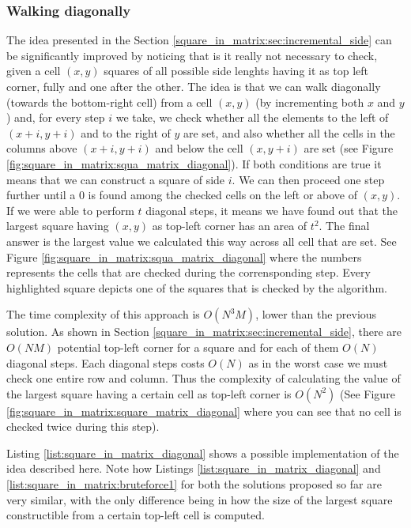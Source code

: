 \subsubsection{Walking diagonally}
The idea presented in the Section \ref{square_in_matrix:sec:incremental_side} can be significantly
improved by noticing that is it really not necessary to check, given a cell $(x,y)$ squares of all
possible side lenghts having it as top left corner, fully and one after the other. The idea is that
we can walk diagonally (towards the bottom-right cell) from a cell $(x,y)$ (by incrementing both $x$
and $y$) and, for every step $i$ we take, we check whether all the elements to the left of $(x+i,
y+i)$  and to the right of  $y$ are set, and also whether all the cells in the columns above $(x+i,
y+i)$ and below the cell $(x,y+i)$ are set (see Figure
\ref{fig:square_in_matrix:squa_matrix_diagonal}). If both conditions are true it means that we can
construct a square of side $i$. We can then proceed one step further until a $0$ is found among the
checked cells on the left or above of $(x,y)$. If we were able to perform $t$ diagonal steps, it
means we have found out that the largest square having $(x,y)$ as top-left corner has an area of
$t^2$. The final answer is the largest value we calculated this way across all cell that are set.
See Figure \ref{fig:square_in_matrix:squa_matrix_diagonal} where the numbers represents the cells
that are checked during the corrensponding step. Every highlighted square depicts one of the squares
that is checked by the algorithm.


The time complexity of this approach is $O(N^3M)$, lower than the previous solution. As shown in
Section \ref{square_in_matrix:sec:incremental_side}, there are $O(NM)$ potential top-left corner for
a square and for each of them $O(N)$ diagonal steps. Each diagonal steps costs $O(N)$ as in the
worst case we must check one entire row and column. Thus the complexity of calculating the value of
the largest square having a certain cell  as top-left corner is $O(N^2)$ (See Figure
\ref{fig:square_in_matrix:square_matrix_diagonal} where you can see that no cell is checked twice
during this step). 

Listing \ref{list:square_in_matrix_diagonal} shows a possible implementation of the idea described
here. Note how Listings \ref{list:square_in_matrix_diagonal} and
\ref{list:square_in_matrix:bruteforce1} for both the solutions proposed so far are very similar,
with the only difference being in how the size of the largest square constructible from a certain
top-left cell is computed.


